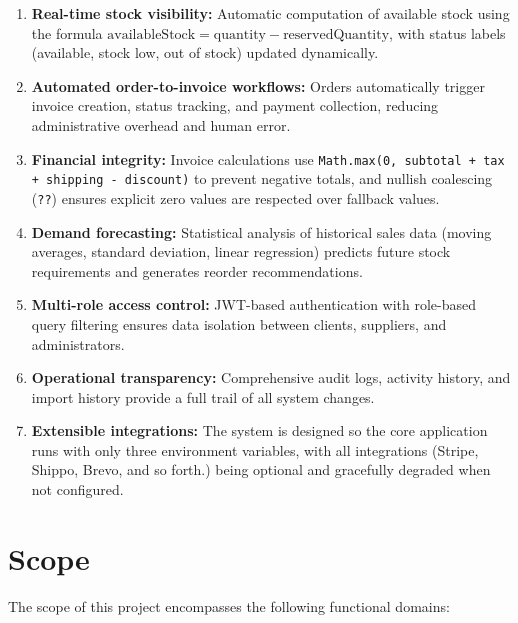 \documentclass[12pt,a4paper]{report}
\begin{document}
\begin{enumerate}[leftmargin=1.5em]
  \item \textbf{Real-time stock visibility:} Automatic computation of available stock using the formula $\text{availableStock} = \text{quantity} - \text{reservedQuantity}$, with status labels (available, stock low, out of stock) updated dynamically.
  \item \textbf{Automated order-to-invoice workflows:} Orders automatically trigger invoice creation, status tracking, and payment collection, reducing administrative overhead and human error.
  \item \textbf{Financial integrity:} Invoice calculations use \texttt{Math.max(0, subtotal + tax + shipping - discount)} to prevent negative totals, and nullish coalescing (\texttt{??}) ensures explicit zero values are respected over fallback values.
  \item \textbf{Demand forecasting:} Statistical analysis of historical sales data (moving averages, standard deviation, linear regression) predicts future stock requirements and generates reorder recommendations.
  \item \textbf{Multi-role access control:} JWT-based authentication with role-based query filtering ensures data isolation between clients, suppliers, and administrators.
  \item \textbf{Operational transparency:} Comprehensive audit logs, activity history, and import history provide a full trail of all system changes.
  \item \textbf{Extensible integrations:} The system is designed so the core application runs with only three environment variables, with all integrations (Stripe, Shippo, Brevo, and so forth.) being optional and gracefully degraded when not configured.
\end{enumerate}

\section{Scope}

The scope of this project encompasses the following functional domains:
\end{document}
